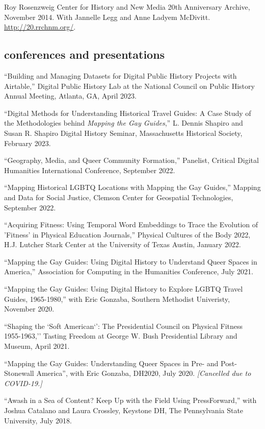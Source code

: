\documentclass[11pt]{article}
\begin{document}
Roy Rosenzweig Center for History and New Media 20th Anniversary Archive, November 2014. With Jannelle Legg and Anne Ladyem McDivitt. \url{http://20.rrchnm.org/}.


\subsection{conferences and presentations}

``Building and Managing Datasets for Digital Public History Projects with Airtable,'' Digital Public History Lab at the National Council on Public History Annual Meeting, Atlanta, GA, April 2023. 

``Digital Methods for Understanding Historical Travel Guides: A Case Study of the Methodologies behind \emph{Mapping the Gay Guides},'' L. Dennis Shapiro and Susan R. Shapiro Digital History Seminar, Massachusetts Historical Society, February 2023. 

``Geography, Media, and Queer Community Formation,'' Panelist, Critical Digital Humanities International Conference, September 2022.

``Mapping Historical LGBTQ Locations with Mapping the Gay Guides,'' Mapping and Data for Social Justice, Clemson Center for Geospatial Technologies, September 2022.

``Acquiring Fitness: Using Temporal Word Embeddings to Trace the Evolution of 'Fitness' in Physical Education Journals,'' Physical Cultures of the Body 2022, H.J. Lutcher Stark Center at the University of Texas Austin, January 2022.

``Mapping the Gay Guides: Using Digital History to Understand Queer Spaces in America,'' Association for Computing in the Humanities Conference, July 2021.

``Mapping the Gay Guides: Using Digital History to Explore LGBTQ Travel Guides, 1965-1980,'' with Eric Gonzaba, Southern Methodist Univeristy, November 2020.

``Shaping the `Soft American`': The Presidential Council on Physical Fitness 1955-1963,'' Tasting Freedom at George W. Bush Presidential Library and Museum, April 2021.

``Mapping the Gay Guides: Understanding Queer Spaces in Pre- and Post-Stonewall America'', with Eric Gonzaba, DH2020, July 2020. \emph{[Cancelled due to COVID-19.]}

``Awash in a Sea of Content? Keep Up with the Field Using PressForward,'' with Joshua Catalano and Laura Crossley, Keystone DH, The Pennsylvania State University, July 2018.
\end{document}
